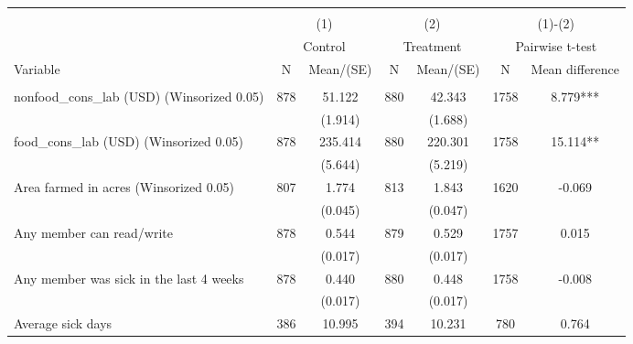 
\begin{tabular}{@{\extracolsep{5pt}}lcccccc}
\\[-1.8ex]\hline \hline \\[-1.8ex]
 & \multicolumn{2}{c}{(1)}  & \multicolumn{2}{c}{(2)}  & \multicolumn{2}{c}{(1)-(2)} \\
 & \multicolumn{2}{c}{Control}  & \multicolumn{2}{c}{Treatment}  & \multicolumn{2}{c}{Pairwise t-test}  \\
Variable & N & Mean/(SE) & N & Mean/(SE) & N & Mean difference \\ \hline \\[-1.8ex] 
nonfood\_cons\_lab (USD) (Winsorized 0.05)   & 878    & 51.122    & 880    & 42.343    & 1758    & 8.779***   \\
 &   & (1.914)  &   & (1.688)  &   &  \\ [1ex]
food\_cons\_lab (USD) (Winsorized 0.05)   & 878    & 235.414    & 880    & 220.301    & 1758    & 15.114**   \\
 &   & (5.644)  &   & (5.219)  &   &  \\ [1ex]
Area farmed in acres (Winsorized 0.05)   & 807    & 1.774    & 813    & 1.843    & 1620    & -0.069   \\
 &   & (0.045)  &   & (0.047)  &   &  \\ [1ex]
Any member can read/write   & 878    & 0.544    & 879    & 0.529    & 1757    & 0.015   \\
 &   & (0.017)  &   & (0.017)  &   &  \\ [1ex]
Any member was sick in the last 4 weeks   & 878    & 0.440    & 880    & 0.448    & 1758    & -0.008   \\
 &   & (0.017)  &   & (0.017)  &   &  \\ [1ex]
Average sick days   & 386    & 10.995    & 394    & 10.231    & 780    & 0.764   \\

\end{tabular}
